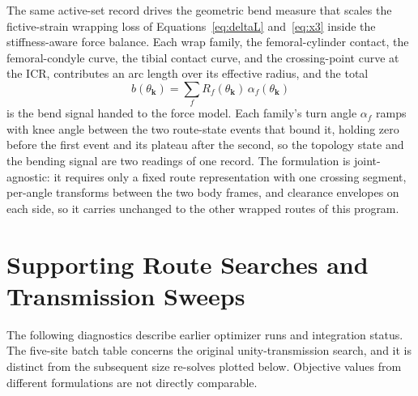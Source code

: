 The same active-set record drives the geometric bend measure that scales the fictive-strain wrapping loss of Equations~\eqref{eq:deltaL} and~\eqref{eq:x3} inside the stiffness-aware force balance. Each wrap family, the femoral-cylinder contact, the femoral-condyle curve, the tibial contact curve, and the crossing-point curve at the ICR, contributes an arc length over its effective radius, and the total
\begin{equation}
b(\theta_{\mathbf{k}}) = \sum_{f} R_{f}(\theta_{\mathbf{k}})\, \alpha_{f}(\theta_{\mathbf{k}})
\label{eq:app_bend_measure}
\end{equation}
is the bend signal handed to the force model. Each family's turn angle $\alpha_{f}$ ramps with knee angle between the two route-state events that bound it, holding zero before the first event and its plateau after the second, so the topology state and the bending signal are two readings of one record. The formulation is joint-agnostic: it requires only a fixed route representation with one crossing segment, per-angle transforms between the two body frames, and clearance envelopes on each side, so it carries unchanged to the other wrapped routes of this program.

\section{Supporting Route Searches and Transmission Sweeps}\label{sec:app_routing_extensions}

The following diagnostics describe earlier optimizer runs and integration status. The five-site batch table concerns the original unity-transmission search, and it is distinct from the subsequent size re-solves plotted below. Objective values from different formulations are not directly comparable.

